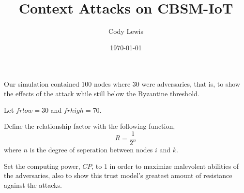 \documentclass{article}
\title{Context Attacks on CBSM-IoT}
\author{Cody Lewis}
\date{\today}
\begin{document}
    \maketitle

    Our simulation contained 100 nodes where 30 were adversaries, that is, to
    show the effects of the attack while still below the Byzantine threshold.

    Let $frlow = 30$ and $frhigh = 70$.

    Define the relationship factor with the following function,
    \begin{equation}
        R = \frac{1}{2^n}
    \end{equation}
    where $n$ is the degree of seperation between nodes $i$ and $k$.

    Set the computing power, $CP$, to $1$ in order to maximize malevolent abilities of
    the adversaries, also to show this trust model's greatest amount of resistance
    against the attacks.

    
    
\end{document}
